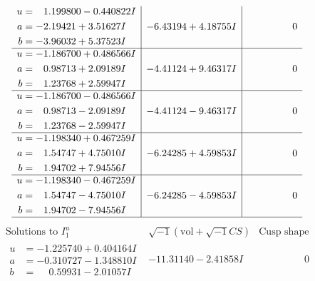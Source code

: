 \documentclass[1p]{elsarticle_modified}
\theoremstyle{definition}
\newcommand{\I}{\sqrt{-1}}
\begin{document}
$$\begin{array}{c|c|c}
\begin{aligned}
u &= \phantom{-}1.199800 - 0.440822 I \\
a &= -2.19421 + 3.51627 I \\
b &= -3.96032 + 5.37523 I\end{aligned}
 & -6.43194 + 4.18755 I & \phantom{-0.000000 } 0 \\ \hline\begin{aligned}
u &= -1.186700 + 0.486566 I \\
a &= \phantom{-}0.98713 + 2.09189 I \\
b &= \phantom{-}1.23768 + 2.59947 I\end{aligned}
 & -4.41124 + 9.46317 I & \phantom{-0.000000 } 0 \\ \hline\begin{aligned}
u &= -1.186700 - 0.486566 I \\
a &= \phantom{-}0.98713 - 2.09189 I \\
b &= \phantom{-}1.23768 - 2.59947 I\end{aligned}
 & -4.41124 - 9.46317 I & \phantom{-0.000000 } 0 \\ \hline\begin{aligned}
u &= -1.198340 + 0.467259 I \\
a &= \phantom{-}1.54747 + 4.75010 I \\
b &= \phantom{-}1.94702 + 7.94556 I\end{aligned}
 & -6.24285 + 4.59853 I & \phantom{-0.000000 } 0 \\ \hline\begin{aligned}
u &= -1.198340 - 0.467259 I \\
a &= \phantom{-}1.54747 - 4.75010 I \\
b &= \phantom{-}1.94702 - 7.94556 I\end{aligned}
 & -6.24285 - 4.59853 I & \phantom{-0.000000 } 0\\
 \hline 
 \end{array}$$\newpage$$\begin{array}{c|c|c}  
\text{Solutions to }I^u_{1}& \I (\text{vol} + \sqrt{-1}CS) & \text{Cusp shape}\\
 \hline 
\begin{aligned}
u &= -1.225740 + 0.404164 I \\
a &= -0.310727 - 1.348810 I \\
b &= \phantom{-}0.59931 - 2.01057 I\end{aligned}
 & -11.31140 - 2.41858 I & \phantom{-0.000000 } 0 \\ \hline\begin{aligned}

\end{aligned}
\end{array}$$
\end{document}
